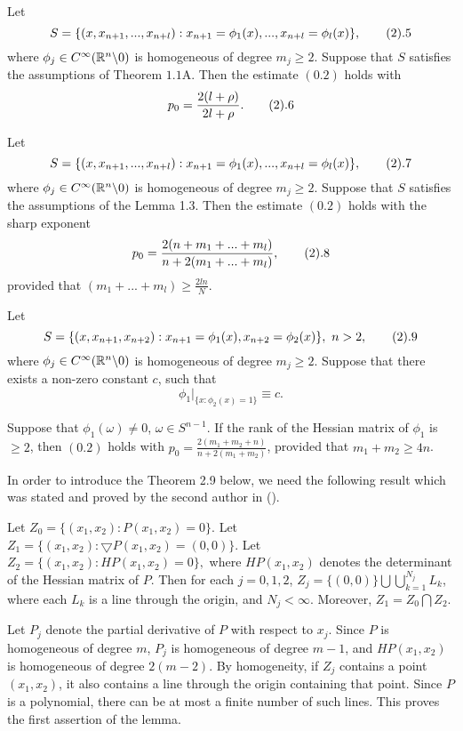  Let 
$$S=\{(x,x_{n+1},..., x_{n+l}): x_{n+1}=
{\phi}_1(x), ..., x_{n+l}={\phi}_l(x)\}, \tag2.5$$
where ${\phi}_j \in C^{\infty}({\Bbb R}^n \backslash 0)$ is homogeneous of degree
$m_j\ge 2$. Suppose that $S$ satisfies the assumptions of Theorem $1.1$A.  
Then the estimate $(0.2)$ holds with  
$$ p_0=\frac{2(l+\rho)}{2l+\rho}. \tag2.6$$   
\endproclaim 

 Let 
$$S=\{(x,x_{n+1},..., x_{n+l}): x_{n+1}=
{\phi}_1(x), ..., x_{n+l}={\phi}_l(x)\}, \tag2.7$$
where ${\phi}_j \in C^{\infty}({\Bbb R}^n \backslash 0)$ is homogeneous of degree
$m_j \ge 2$. Suppose that $S$ satisfies the assumptions of the Lemma 1.3. Then 
the estimate $(0.2)$ holds with the sharp exponent 
$$ p_0=\frac{2(n+m_1+...+ m_l)}{n+2(m_1+...+m_l)}, \tag2.8$$ provided that 
$(m_1+... +m_l) \ge \frac{2ln}{N}$. 
\endproclaim

 Let 
$$ S=\{(x,x_{n+1}, x_{n+2}): 
x_{n+1}={\phi}_1(x), x_{n+2}={\phi}_2(x)\}, \ n>2, \tag2.9$$ where 
${\phi}_j \in C^{\infty}({\Bbb R}^n \backslash 0)$ is homogeneous of degree 
$m_j \ge 2$. Suppose that there exists a non-zero constant $c$, such that 
$$ {\phi}_1 {|}_{\{x: {\phi}_2(x)=1\}} \equiv c.$$ 

Suppose that ${\phi}_1(\omega)\not=0$, $\omega \in S^{n-1}$.  
If the rank of the Hessian matrix of ${\phi}_1$ is $\ge 2$, then 
$(0.2)$ holds with $p_0=\frac{2(m_1+m_2+n)}{n+2(m_1+m_2)}$, provided that 
$m_1+m_2 \ge 4n$. 
\endproclaim  

In order to introduce the Theorem 2.9 below, we need the following result which 
was stated and proved by the second author in (\cite{I2}). 

 Let $Z_0=\{(x_1,x_2): P(x_1,x_2)=0\}$. Let 
$Z_1=\{(x_1,x_2): \bigtriangledown P(x_1,x_2)=(0,0)\}$. Let 
$Z_2=\{(x_1,x_2): HP(x_1,x_2)=0\},$ where $HP(x_1,x_2)$ denotes the determinant 
of the Hessian matrix of $P$. Then for each $j=0,1,2$,  
$Z_j=\{(0,0)\} \bigcup {\bigcup}^{N_j}_{k=1}L_k$, where each $L_k$ is a line
through the origin, and $N_j<\infty$. Moreover, $Z_1=Z_0\bigcap Z_2$. 
\endproclaim 

 Let $P_j$ denote the partial derivative of $P$ with
respect to $x_j$. Since $P$ is homogeneous of degree $m$, $P_j$ is homogeneous
of degree $m-1$, and $HP(x_1,x_2)$ is homogeneous of degree $2(m-2)$. By   
homogeneity, if $Z_j$ contains a point $(x_1,x_2)$, it also contains a line 
through the origin containing that point. Since $P$ is a polynomial, there can
be at most a finite number of such lines. This proves the first assertion of
the lemma. 

